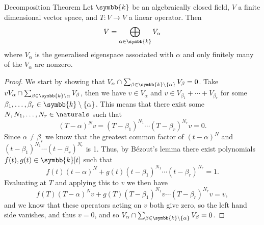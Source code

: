 \documentclass[fleqn]{NotesClass}
\renewcommand{\field}{\symbb{k}}
\begin{document}
    \begin{thm}{Decomposition Theorem}{}
        Let \(\field\) be an algebraically closed field, \(V\) a finite dimensional vector space, and \(T \colon V \to V\) a linear operator.
        Then
        \begin{equation}
            V = \bigoplus_{\alpha \in \field} V_\alpha 
        \end{equation}
        where \(V_\alpha\) is the generalised eigenspace associated with \(\alpha\) and only finitely many of the \(V_\alpha\) are nonzero.
        \begin{proof}
            We start by showing that \(V_\alpha \cap \sum_{\beta \in \field \setminus \{\alpha\}} V_\beta = 0\).
            Take \(v V_\alpha \cap \sum_{\beta \in \field \setminus \alpha} V_\beta\), then we have \(v \in V_\alpha\) and \(v \in V_{\beta_1} + \dotsb + V_{\beta_r}\) for some \(\beta_1, \dotsc, \beta_r \in \field \setminus \{\alpha\}\).
            This means that there exist some \(N, N_1, \dotsc, N_r \in \naturals\) such that
            \begin{equation}
                (T - \alpha)^Nv = (T - \beta_1)^{N_1} \dotsm (T - \beta_r)^{N_r} v = 0.
            \end{equation}
            Since \(\alpha \ne \beta_i\) we know that the greatest common factor of \((t - \alpha)^N\) and \((t - \beta_1)^{N_1} \dotsm (t - \beta_r)^{N_r}\) is 1.
            Thus, by B\'ezout's lemma there exist polynomials \(f(t), g(t) \in \field[t]\) such that
            \begin{equation}
                f(t)(t - \alpha)^N + g(t)(t - \beta_1)^{N_1} \dotsm (t - \beta_r)^{N_r} = 1.
            \end{equation}
            Evaluating at \(T\) and applying this to \(v\) we then have
            \begin{equation}
                f(T)(T - \alpha)^Nv + g(T)(T - \beta_1)^{N_1}v \dotsm (T - \beta_r)^{N_r}v = v,
            \end{equation}
            and we know that these operators acting on \(v\) both give zero, so the left hand side vanishes, and thus \(v = 0\), and so \(V_\alpha \cap \sum_{\beta \in \field \setminus \{\alpha\}} V_\beta = 0\).
            

\end{proof}
\end{thm}
\end{document}
